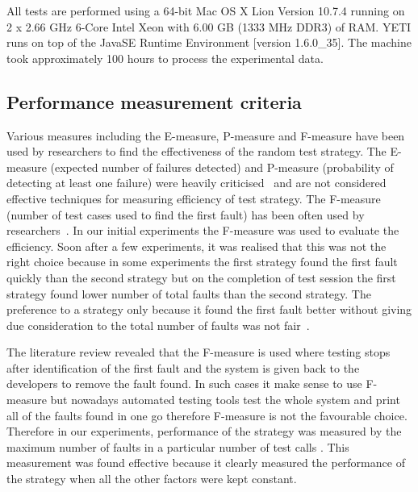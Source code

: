 \documentclass{acm_proc_article-sp}
\begin{document}
All tests are performed using a 64-bit Mac OS X Lion Version 10.7.4 running on 2 x 2.66 GHz 6-Core Intel Xeon with 6.00 GB (1333 MHz DDR3) of RAM. YETI runs on top of the Java\texttrademark  SE Runtime Environment [version 1.6.0\_35]. The machine took approximately 100 hours to process the experimental data.


\subsection{Performance measurement criteria}
Various measures including the E-measure, P-measure and F-measure have been used by researchers to find the effectiveness of the random test strategy. The E-measure (expected number of failures detected) and P-measure (probability of detecting at least one failure) were heavily criticised~\cite{Chen2008} and are not considered effective techniques for measuring efficiency of test strategy. The F-measure (number of test cases used to find the first fault) has been often used by researchers~\cite{Chen1996, Chen2004}. In our initial experiments the F-measure was used to evaluate the efficiency. Soon after a few experiments, it was realised that this was not the right choice because in some experiments the first strategy found the first fault quickly than the second strategy but on the completion of test session the first strategy found lower number of total faults than the second strategy. The preference to a strategy only because it found the first fault better without giving due consideration to the total number of faults was not fair~\cite{Liu2012}.


  
The literature review revealed that the F-measure is used where testing stops after identification of the first fault and the system is given back to the developers to remove the fault found. In such cases it make sense to use F-measure but nowadays automated testing tools test the whole system and print all of the faults found in one go therefore F-measure is not the favourable choice. Therefore in our experiments, performance of the strategy was measured by the maximum number of faults in a particular number of test calls \cite{Pacheco2007a, Ciupa2007, Ciupa2008b}. This measurement was found effective because it clearly measured the performance of the strategy when all the other factors were kept constant.
\end{document}
